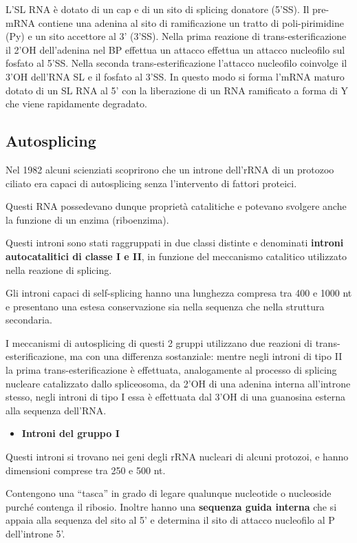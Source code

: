 \documentclass[11pt]{book}
\begin{document}
L'SL RNA è dotato di un cap e di un sito di splicing donatore (5'SS). Il
pre-mRNA contiene una adenina al sito di ramificazione un tratto di
poli-pirimidine (Py) e un sito accettore al 3' (3'SS). Nella prima
reazione di trans-esterificazione il 2'OH dell'adenina nel BP effettua
un attacco effettua un attacco nucleofilo sul fosfato al 5'SS. Nella
seconda trans-esterificazione l'attacco nucleofilo coinvolge il 3'OH
dell'RNA SL e il fosfato al 3'SS. In questo modo si forma l'mRNA maturo
dotato di un SL RNA al 5' con la liberazione di un RNA ramificato a
forma di Y che viene rapidamente degradato.

\subsection{Autosplicing}\label{autosplicing}

Nel 1982 alcuni scienziati scoprirono che un introne dell'rRNA di un
protozoo ciliato era capaci di autosplicing senza l'intervento di
fattori proteici.

Questi RNA possedevano dunque proprietà catalitiche e potevano svolgere
anche la funzione di un enzima (riboenzima).

Questi introni sono stati raggruppati in due classi distinte e
denominati \textbf{introni autocatalitici di classe I e II}, in funzione
del meccanismo catalitico utilizzato nella reazione di splicing.

Gli introni capaci di self-splicing hanno una lunghezza compresa tra 400
e 1000 nt e presentano una estesa conservazione sia nella sequenza che
nella struttura secondaria.

I meccanismi di autosplicing di questi 2 gruppi utilizzano due reazioni
di trans-esterificazione, ma con una differenza sostanziale: mentre
negli introni di tipo II la prima trans-esterificazione è effettuata,
analogamente al processo di splicing nucleare catalizzato dallo
spliceosoma, da 2'OH di una adenina interna all'introne stesso, negli
introni di tipo I essa è effettuata dal 3'OH di una guanosina esterna
alla sequenza dell'RNA.

\begin{itemize}
\itemsep1pt\parskip0pt
\item
  \textbf{Introni del gruppo I}
\end{itemize}

Questi introni si trovano nei geni degli rRNA nucleari di alcuni
protozoi, e hanno dimensioni comprese tra 250 e 500 nt.

Contengono una ``tasca'' in grado di legare qualunque nucleotide o
nucleoside purché contenga il ribosio. Inoltre hanno una
\textbf{sequenza guida interna} che si appaia alla sequenza del sito al
5' e determina il sito di attacco nucleofilo al P dell'introne 5'.
\end{document}
